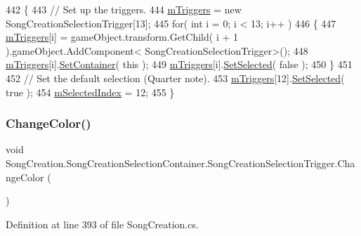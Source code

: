 \begin{DoxyCode}
442         \{
443             \textcolor{comment}{// Set up the triggers.}
444             \hyperlink{group___s_c_handlers_ga89fbb92f878e65f27bee6edbf920da22}{mTriggers} = \textcolor{keyword}{new} SongCreationSelectionTrigger[13];
445             \textcolor{keywordflow}{for}( \textcolor{keywordtype}{int} i = 0; i < 13; i++ )
446             \{
447                 \hyperlink{group___s_c_handlers_ga89fbb92f878e65f27bee6edbf920da22}{mTriggers}[i] = gameObject.transform.GetChild( i + 1 ).gameObject.AddComponent<
      SongCreationSelectionTrigger>();
448                 \hyperlink{group___s_c_handlers_ga89fbb92f878e65f27bee6edbf920da22}{mTriggers}[i].\hyperlink{group___s_c_handlers_gaa9ae3234792bb4a0ee0cb16d00563130}{SetContainer}( \textcolor{keyword}{this} );
449                 \hyperlink{group___s_c_handlers_ga89fbb92f878e65f27bee6edbf920da22}{mTriggers}[i].\hyperlink{group___s_c_handlers_ga477673c43fb3b828ed54d06d00e93f08}{SetSelected}( \textcolor{keyword}{false} );
450             \}
451 
452             \textcolor{comment}{// Set the default selection (Quarter note).}
453             \hyperlink{group___s_c_handlers_ga89fbb92f878e65f27bee6edbf920da22}{mTriggers}[12].\hyperlink{group___s_c_handlers_ga477673c43fb3b828ed54d06d00e93f08}{SetSelected}( \textcolor{keyword}{true} );
454             \hyperlink{group___s_c_handlers_ga33015c7ac7e8cebb24b1fc97c70b4ed7}{mSelectedIndex} = 12;
455         \}
\end{DoxyCode}
\mbox{\label{group___s_c_handlers_ga3e790d06e364f26ed6f8a78cb87bbf6d}} 
\subsubsection{\texorpdfstring{Change\+Color()}{ChangeColor()}}
{\footnotesize\ttfamily void Song\+Creation.\+Song\+Creation\+Selection\+Container.\+Song\+Creation\+Selection\+Trigger.\+Change\+Color (\begin{DoxyParamCaption}{ }\end{DoxyParamCaption})\hspace{0.3cm}{\ttfamily [private]}}



Definition at line 393 of file Song\+Creation.\+cs.


